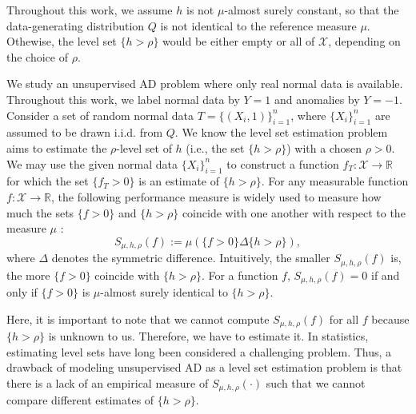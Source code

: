 \documentclass{article}
\def\RR{\mathbb R}
\begin{document}
Throughout this work, we assume $h$ is not $\mu$-almost surely constant, so that the data-generating distribution $Q$ is not identical to the reference measure $\mu$. Othewise, the level set  $\{h > \rho\}$ would be either empty or all of $\mathcal X$, depending on the choice of $\rho$.


We study an unsupervised AD problem where only real normal data is available. 
Throughout this work, we label normal data 
by $Y=1$ and anomalies by $Y=-1$.
Consider a set of random normal data $T= \{(X_i,1)\}_{i=1}^{n}$, where $\{X_i\}_{i=1}^n$ are assumed to be drawn i.i.d. from $Q$.
We know the level set estimation problem aims to estimate the $\rho$-level set of $h$ (i.e., the set $\{h>\rho\}$) with a chosen $\rho>0$. 
We may use the given normal data $\{X_i\}_{i=1}^n$ to construct a function $f_{T}:\mathcal{X} \to \RR$ for which the set $\{f_{T} > 0\}$
is an estimate of $\{h>\rho\}$.
For any measurable function $f: \mathcal{X} \to \RR$, the following performance measure is widely used
to measure how much the sets $\{f>0\}$ and  $\{h>\rho\}$ coincide with one another with respect to the measure $\mu$ \citep{tsybakov1997nonparametric, ben1997learning, halmos2013measure}:
\begin{equation}\label{DLDmeasure}
    S_{\mu,h,\rho}(f):= \mu\left(\{f>0\}\Delta\{h>\rho\}\right),
\end{equation}
where $\Delta$ denotes the symmetric difference. 
Intuitively, the smaller $S_{\mu,h,\rho}(f)$ is, the more $\{f>0\}$ coincide with $\{h>\rho\}$. For a function $f$, $S_{\mu,h,\rho}(f) =0$ if and only if $\{f>0\}$ is $\mu$-almost surely identical to $\{h>\rho\}$. 

Here, it is important to note that we cannot compute $S_{\mu,h,\rho}(f)$ for all $f$ because $\{h>\rho\}$ is unknown to us. Therefore, we have to estimate it. In statistics, estimating level sets have long been considered a challenging problem.  
Thus, a drawback of modeling unsupervised AD as a level set estimation problem is that there is a lack of an empirical measure of $S_{\mu,h,\rho}(\cdot)$ such that we cannot compare different estimates of $\{h>\rho\}$.
\end{document}
